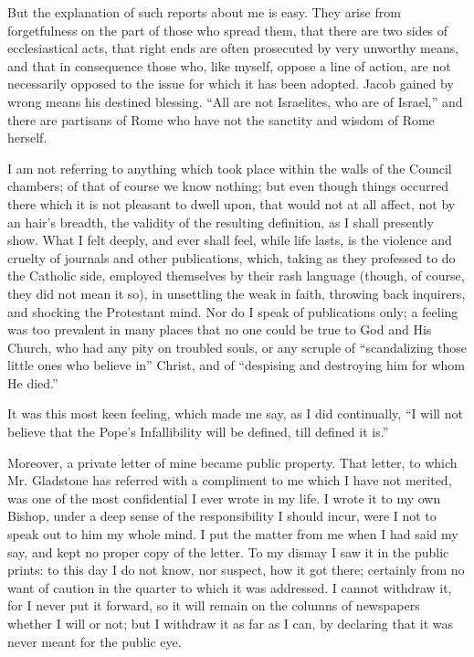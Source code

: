But the explanation of such reports about me is easy. They arise from
forgetfulness on the part of those who spread them, that there are two
sides of ecclesiastical acts, that right ends are often prosecuted by
very unworthy means, and that in consequence those who, like myself,
oppose a line of action, are not necessarily opposed to the issue for
which it has been adopted. Jacob gained by wrong means his
destined blessing. ``All are not Israelites, who are of
Israel,'' and there are partisans of Rome who have not the sanctity
and wisdom of Rome herself.

I am not referring to anything which took place within the walls of
the Council chambers; of that of course we know nothing; but even though
things occurred there which it is not pleasant to dwell upon, that would
not at all affect, not by an hair's breadth, the validity of the
resulting definition, as I shall presently show. What I felt deeply, and
ever shall feel, while life lasts, is the violence and cruelty of
journals and other publications, which, taking as they professed to do
the Catholic side, employed themselves by their rash language (though,
of course, they did not mean it so), in unsettling the weak in faith,
throwing back inquirers, and shocking the Protestant mind. Nor do I
speak of publications only; a feeling was too prevalent in many places
that no one could be true to God and His Church, who had any pity on
troubled souls, or any scruple of ``scandalizing those little ones
who believe in'' Christ, and of ``despising and destroying him
for whom He died.''

It was this most keen feeling, which made me say, as I did
continually, ``I will not believe that the Pope's Infallibility will
be defined, till defined it is.''

Moreover, a private letter of mine became public property. That
letter, to which Mr. Gladstone has referred with a compliment to me
which I have not merited, was one of the most confidential I ever wrote
in my life. I wrote it to my own Bishop, under a deep sense of the responsibility I should incur, were I not to speak out to him my whole
mind. I put the matter from me when I had said my say, and kept no
proper copy of the letter. To my dismay I saw it in the public prints:
to this day I do not know, nor suspect, how it got there; certainly from
no want of caution in the quarter to which it was addressed. I cannot
withdraw it, for I never put it forward, so it will remain on the
columns of newspapers whether I will or not; but I withdraw it as far as
I can, by declaring that it was never meant for the public eye.

